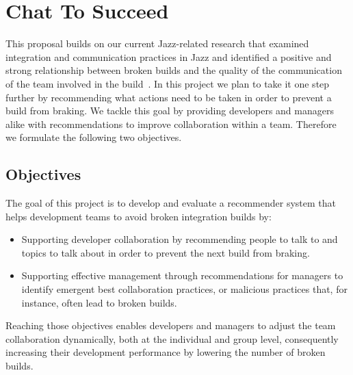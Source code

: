 \documentclass{sig-alternate}
\begin{document}
\section{Chat To Succeed}
This proposal builds on our current Jazz-related research that examined
integration and communication practices in Jazz and identified a positive and
strong relationship between broken builds and the quality of the communication
of the team involved in the build~\cite{wolf:tr2008}. In this project we plan
to take it one step further by recommending what actions need to be taken in order to prevent a build
from braking. We tackle this goal by providing developers and managers alike with
recommendations to improve collaboration within a team.
Therefore we formulate the following two objectives.

\subsection{Objectives}
The goal of this project is to develop and evaluate a recommender system that
helps development teams to avoid broken integration builds by:
 \vspace{-5pt}
\begin{itemize}
\item Supporting developer collaboration by recommending people to talk to and
topics to talk about in order to prevent the next build from
braking.\vspace{-8pt}
\item Supporting effective management through recommendations for managers to
identify emergent best collaboration practices, or malicious practices that, for
instance, often lead to broken builds.
\end{itemize}
\vspace{-5pt}
Reaching those objectives enables developers and managers to adjust the team
collaboration dynamically, both at the individual and group level, consequently 
increasing their development performance by lowering the number of broken
builds.

\end{document}

